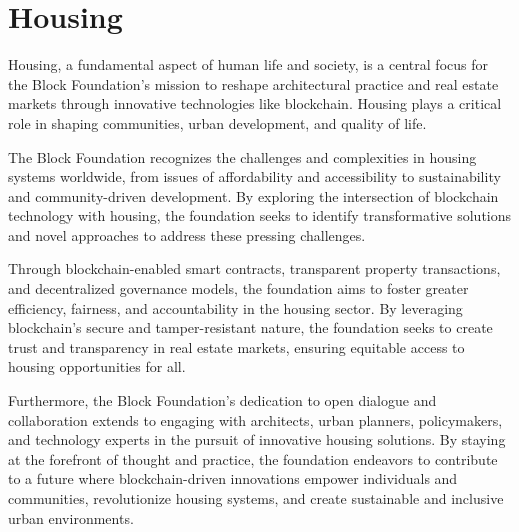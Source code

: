 \section{Housing}


Housing, a fundamental aspect of human life and society, is a central focus for the Block Foundation's mission to reshape architectural practice and real estate markets through innovative technologies like blockchain. Housing plays a critical role in shaping communities, urban development, and quality of life.

The Block Foundation recognizes the challenges and complexities in housing systems worldwide, from issues of affordability and accessibility to sustainability and community-driven development. By exploring the intersection of blockchain technology with housing, the foundation seeks to identify transformative solutions and novel approaches to address these pressing challenges.

Through blockchain-enabled smart contracts, transparent property transactions, and decentralized governance models, the foundation aims to foster greater efficiency, fairness, and accountability in the housing sector. By leveraging blockchain's secure and tamper-resistant nature, the foundation seeks to create trust and transparency in real estate markets, ensuring equitable access to housing opportunities for all.

Furthermore, the Block Foundation's dedication to open dialogue and collaboration extends to engaging with architects, urban planners, policymakers, and technology experts in the pursuit of innovative housing solutions. By staying at the forefront of thought and practice, the foundation endeavors to contribute to a future where blockchain-driven innovations empower individuals and communities, revolutionize housing systems, and create sustainable and inclusive urban environments.